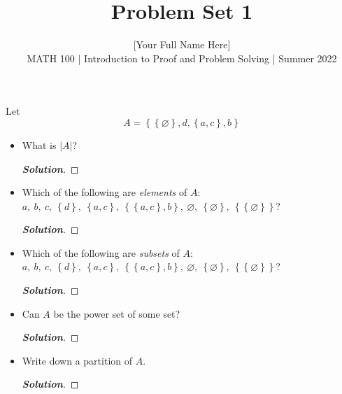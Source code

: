 \documentclass[11pt]{article}
\newenvironment{problem}[2][Problem\!]{\begin{trivlist}
\item[\hskip \labelsep {\bfseries #1}\hskip \labelsep {\bfseries #2.}]}{\end{trivlist}}
\newenvironment{solution}{\begin{proof}[\textbf{\textit{Solution}}]}{\end{proof}}
\newcommand{\abs}[1]{\left\lvert#1\right\rvert} %
\newcommand{\set}[1]{\left\{#1\right\}} %
\renewcommand{\emptyset}{\varnothing}
\begin{document}
 
\title{Problem Set 1}
\author{[Your Full Name Here]\\[0.5em]
MATH 100 | Introduction to Proof and Problem Solving | Summer 2022}
\date{} 
\maketitle


\begin{problem}{1.1}
Let 
\[A = \set{\set{\emptyset},d,\set{a,c},b}\]
\begin{itemize}[itemsep=3em]
\item[(a)] What is $\abs{A}$?
\begin{solution}\hfill %
\end{solution}

\item[(b)] Which of the following are \emph{elements} of $A$: $a,\ b,\ c,\ \set{d},\ \set{a,c},\ \set{\set{a,c},b},\ \emptyset,\ \set{\emptyset},\ \set{\set{\emptyset}}$?
\begin{solution}\hfill %
\end{solution}

\item[(c)] Which of the following are \emph{subsets} of $A$: $a,\ b,\ c,\ \set{d},\ \set{a,c},\ \set{\set{a,c},b},\ \emptyset,\ \set{\emptyset},\ \set{\set{\emptyset}}$?
\begin{solution}\hfill %
\end{solution}

\item[(d)] Can $A$ be the power set of some set?
\begin{solution}\hfill %
\end{solution}

\item[(e)] Write down a partition of $A$.
\begin{solution}\hfill %
\end{solution}

\end{itemize}
\end{problem}
\end{document}
